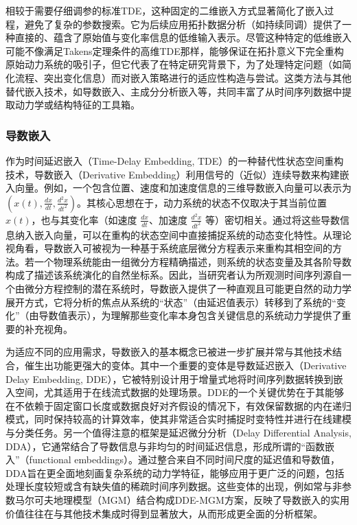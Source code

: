 相较于需要仔细调参的标准TDE，这种固定的二维嵌入方式显著简化了嵌入过程，避免了复杂的参数搜索。它为后续应用拓扑数据分析（如持续同调）提供了一种直接的、蕴含了原始值与变化率信息的低维输入表示。尽管这种特定的低维嵌入可能不像满足Takens定理条件的高维TDE那样，能够保证在拓扑意义下完全重构原始动力系统的吸引子，但它代表了在特定研究背景下，为了处理特定问题（如简化流程、突出变化信息）而对嵌入策略进行的适应性构造与尝试。这类方法与其他替代嵌入技术，如导数嵌入、主成分分析嵌入等，共同丰富了从时间序列数据中提取动力学或结构特征的工具箱。

\subsubsection{导数嵌入}
作为时间延迟嵌入（Time-Delay Embedding, TDE）的一种替代性状态空间重构技术，导数嵌入\cite{lekscha2018phase}（Derivative Embedding）利用信号的（近似）连续导数来构建嵌入向量。例如，一个包含位置、速度和加速度信息的三维导数嵌入向量可以表示为 $(x(t), \frac{dx}{dt}, \frac{d^2x}{dt^2})$。其核心思想在于，动力系统的状态不仅取决于其当前位置 $x(t)$，也与其变化率（如速度 $\frac{dx}{dt}$、加速度 $\frac{d^2x}{dt^2}$ 等）密切相关。通过将这些导数信息纳入嵌入向量，可以在重构的状态空间中直接捕捉系统的动态变化特性。从理论视角看，导数嵌入可被视为一种基于系统底层微分方程表示来重构其相空间的方法。若一个物理系统能由一组微分方程精确描述，则系统的状态变量及其各阶导数构成了描述该系统演化的自然坐标系。因此，当研究者认为所观测时间序列源自一个由微分方程控制的潜在系统时，导数嵌入提供了一种直观且可能更自然的动力学展开方式，它将分析的焦点从系统的“状态”（由延迟值表示）转移到了系统的“变化”（由导数值表示），为理解那些变化率本身包含关键信息的系统动力学提供了重要的补充视角。

为适应不同的应用需求，导数嵌入的基本概念已被进一步扩展并常与其他技术结合，催生出功能更强大的变体。其中一个重要的变体是导数延迟嵌入（Derivative Delay Embedding, DDE），它被特别设计用于增量式地将时间序列数据转换到嵌入空间，尤其适用于在线流式数据的处理场景。DDE的一个关键优势在于其能够在不依赖于固定窗口长度或数据良好对齐假设的情况下，有效保留数据的内在递归模式，同时保持较高的计算效率，使其非常适合实时捕捉时变特性并进行在线建模与分类任务。另一个值得注意的框架是延迟微分分析（Delay Differential Analysis, DDA），它通常结合了导数信息与非均匀的时间延迟信息，形成所谓的“函数嵌入”（functional embeddings）。通过整合来自不同时间尺度的延迟值和导数值，DDA旨在更全面地刻画复杂系统的动力学特征，能够应用于更广泛的问题，包括处理长度较短或含有缺失值的稀疏时间序列数据。这些变体的出现，例如常与非参数马尔可夫地理模型（MGM）结合构成DDE-MGM方案，反映了导数嵌入的实用价值往往在与其他技术集成时得到显著放大，从而形成更全面的分析框架。

